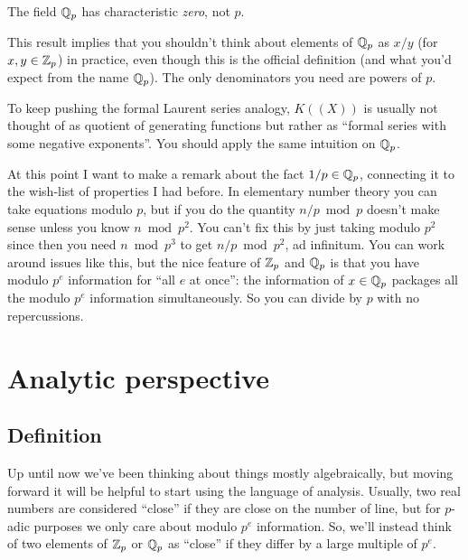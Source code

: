 \begin{remark}
	[Warning]
	The field $\mathbb Q_p$ has characteristic \emph{zero}, not $p$.
\end{remark}
\begin{remark}
	This result implies that you shouldn't think about elements of $\mathbb Q_p$
	as $x/y$ (for $x,y \in \mathbb Z_p$) in practice,
	even though this is the official definition
	(and what you'd expect from the name $\mathbb Q_p$).
	The only denominators you need are powers of $p$.

	To keep pushing the formal Laurent series analogy,
	$K((X))$ is usually not thought of as quotient of generating functions
	but rather as ``formal series with some negative exponents''.
	You should apply the same intuition on $\mathbb Q_p$.
\end{remark}

\begin{remark}
At this point I want to make a remark about the fact $1/p \in \mathbb Q_p$,
connecting it to the wish-list of properties I had before.
In elementary number theory you can take equations modulo $p$,
but if you do the quantity $n/p \bmod{p}$ doesn't make sense
unless you know $n \bmod{p^2}$.
You can't fix this by just taking modulo $p^2$
since then you need $n \bmod{p^3}$ to get $n/p \bmod{p^2}$, ad infinitum.
You can work around issues like this,
but the nice feature of $\mathbb Z_p$ and $\mathbb Q_p$
is that you have modulo $p^e$ information for ``all $e$ at once'':
the information of $x \in \mathbb Q_p$ packages all the modulo $p^e$
information simultaneously.
So you can divide by $p$ with no repercussions.
\end{remark}


\section{Analytic perspective}
\subsection{Definition}
Up until now we've been thinking about things mostly algebraically,
but moving forward it will be helpful to start using the language of analysis.
Usually, two real numbers are considered ``close'' if
they are close on the number of line,
but for $p$-adic purposes we only care about modulo $p^e$ information.
So, we'll instead think of two elements of $\mathbb Z_p$ or $\mathbb Q_p$
as ``close'' if they differ by a large multiple of $p^e$.

